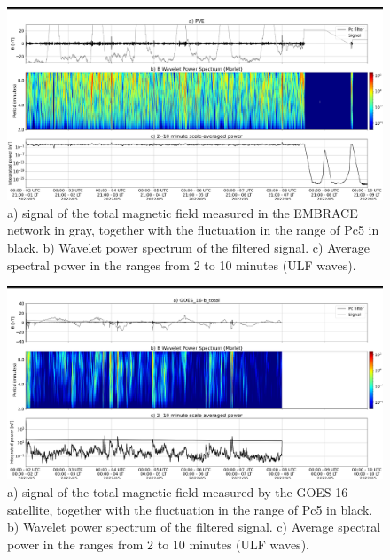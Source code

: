 \documentclass[a4paper, 10pt]{article}
\begin{document}
                        \begin{figure}[H]
    
                            \centering
   
                                \includegraphics[width=14cm]{./figures//figureULF_1.png}

                                \caption{a) signal of the total magnetic field 
                              measured in the EMBRACE network in gray, together with
                               the fluctuation in the range of Pc5 in black. b)
                                Wavelet power spectrum of the filtered signal. c) 
                                Average spectral power in the ranges from 2 to 10
                                 minutes (ULF waves).}
                            \end{figure}

                        \begin{figure}[H]
    
                            \centering
   
                                \includegraphics[width=14cm]{./figures//figureULF_2.png}

                                \caption{a) signal of the total magnetic field 
                              measured by the GOES 16 satellite, together with the 
                              fluctuation in the range of Pc5 in black. b) Wavelet 
                              power spectrum of the filtered signal. c) Average 
                              spectral power in the ranges from 2 to 10 minutes 
                              (ULF waves).}
                            \end{figure}
\end{document}
